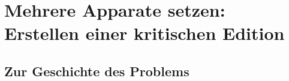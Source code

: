 
\chapter[Mehrere Apparate setzen: Erstellen einer kritischen Edition]{Mehrere Apparate setzen:\\Erstellen einer kritischen Edition}



 
\label{reledmac}


\newcommand\vari[3][]{%
\edtext{#2}{%
  \if$#1$\lemma{\gkk{#2}}\else\lemma{\gkk{#1}}\fi
  \Cfootnote{#3}}}

\newcommand\quell[3][]{%
\edtext{#2}{%
  \if$#1$\lemma{\gkk{#2}}\else\lemma{\gkk{#1}}\fi
  \Bfootnote{#3}}}

\newsavebox\bspbox
\newenvironment{reledmacbsp}[1]{%
  \begin{lrbox}{\bspbox}
  \begin{minipage}[t]{0.95\linewidth}
  \beginnumbering
  #1%
  \pstart[\subsubsection*{Strabons Geographika XIV 5,1}]%
}%
{%
  \pend
  \stopmsdata
  \endnumbering
  \end{minipage}%
  \end{lrbox}%
}

\newcommand\bsplineenum{\firstlinenum{2}\linenumincrement{2}}

\setcounter{alteSeite}{269}
\newcommand\alteSeite{{|\ledsidenote{\emph{T}~\thealteSeite}}}%

\VerbatimFootnotes
\DefineShortVerb{\+}

\section{Zur Geschichte des Problems}

